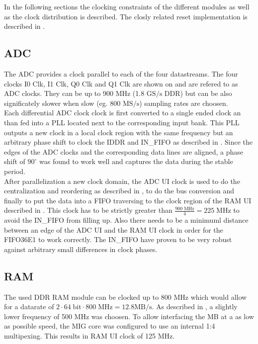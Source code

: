 In the following sections the clocking constraints of the different modules
as well as the clock distribution is described. The closly related reset
implementation is described in . \\

\subsection{\gls{ADC}}
The \gls{ADC} provides a clock parallel to each of the four datastreams.
The four clocks I0 Clk, I1 Clk, Q0 Clk and Q1 Clk are shown on
 and are refered to as \gls{ADC} clocks.
They can be up to 900 MHz (1.8 $\text{GS}/\text{s}$  \gls{DDR})
but can be also significately slower when slow (eg. 800 $\text{MS}/\text{s}$)
sampling rates are choosen. \\

Each differential \gls{ADC} clock clock is first converted to a single ended
clock an than fed into a \gls{PLL} located next to the corresponding input
bank. This \gls{PLL} outputs a new clock in a local clock region
with the same frequency but an arbitrary phase shift
to clock the IDDR and IN\_FIFO as described in .
Since the edges of the \gls{ADC} clocks and the corresponding data lines
are aligned, a phase shift of $90^\circ$ was found to work well and captures
the data during the stable period. \\

After parallelization a new clock domain, the \gls{ADC} \gls{UI} clock
is used to do the centralization and reordering as described in
,
to do the bus conversion and finally to put the data into a \gls{FIFO}
traversing to the clock region of the \gls{RAM} \gls{UI} described
in . This clock has to be strictly greater than
$\frac{900\;\text{MHz}}{4} = 225\;\text{MHz}$ to avoid the
IN\_FIFO from filling up. Also there needs to be a minimuml
distance between an edge of the \gls{ADC} \gls{UI} and the
\gls{RAM} \gls{UI} clock in order for the FIFO36E1 to work correctly.
The IN\_FIFO have proven to be very robust against arbitrary small
differences in clock phases. \\

\subsection{\gls{RAM}}
\label{sec:fpga_clock_ram}
The used \gls{DDR} \gls{RAM} module can be clocked up to 800 MHz which would
allow for a datarate of
$2 \cdot 64\;\text{bit} \cdot 800\;\text{MHz} = 12.8 \text{MB} / \text{s}$.
As described in , a slightly lower frequency of 500 MHz
was choosen. To allow interfacing the \gls{MB} at a as low as possible speed,
the \gls{MIG} core was configured to use an internal 1:4 multipexing. This results
in \gls{RAM} \gls{UI} clock of 125 MHz.

